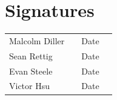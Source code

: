 \documentclass[12pt]{article}
\begin{document}
\pagebreak

\section{Signatures}

\begin{tabular}{l l l l} Malcolm Diller & \underline{\hspace{6cm}} & Date
\underline{\hspace{2cm}}\\ Sean Rettig & \underline{\hspace{6cm}} & Date
\underline{\hspace{2cm}}\\ Evan Steele & \underline{\hspace{6cm}} & Date
\underline{\hspace{2cm}}\\ Victor Hsu & \underline{\hspace{6cm}} & Date
\underline{\hspace{2cm}} \end{tabular}
    
\end{document}
